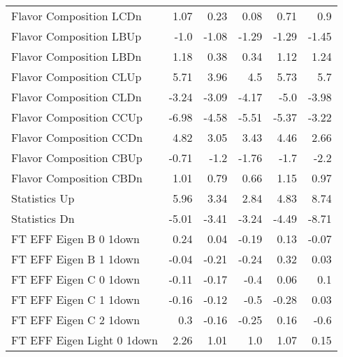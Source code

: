 \begin{table}[htbp]
{\begin{tabular}{lrrrrr}
Flavor Composition LCDn                                                  & 1.07              & 0.23   & 0.08  & 0.71  & 0.9    \\
Flavor Composition LBUp                                                  & -1.0              & -1.08  & -1.29 & -1.29 & -1.45  \\
Flavor Composition LBDn                                                  & 1.18              & 0.38   & 0.34  & 1.12  & 1.24   \\
Flavor Composition CLUp                                                  & 5.71              & 3.96   & 4.5   & 5.73  & 5.7    \\
Flavor Composition CLDn                                                  & -3.24             & -3.09  & -4.17 & -5.0  & -3.98  \\
Flavor Composition CCUp                                                  & -6.98             & -4.58  & -5.51 & -5.37 & -3.22  \\
Flavor Composition CCDn                                                  & 4.82              & 3.05   & 3.43  & 4.46  & 2.66   \\
Flavor Composition CBUp                                                  & -0.71             & -1.2   & -1.76 & -1.7  & -2.2   \\
Flavor Composition CBDn                                                  & 1.01              & 0.79   & 0.66  & 1.15  & 0.97   \\
Statistics Up                                                & 5.96              & 3.34   & 2.84  & 4.83  & 8.74   \\
Statistics Dn                                                & -5.01             & -3.41  & -3.24 & -4.49 & -8.71  \\
FT EFF Eigen B 0  1down                         & 0.24              & 0.04   & -0.19 & 0.13  & -0.07  \\
FT EFF Eigen B 1  1down                         & -0.04             & -0.21  & -0.24 & 0.32  & 0.03   \\
FT EFF Eigen C 0  1down                         & -0.11             & -0.17  & -0.4  & 0.06  & 0.1    \\
FT EFF Eigen C 1  1down                         & -0.16             & -0.12  & -0.5  & -0.28 & 0.03   \\
FT EFF Eigen C 2  1down                         & 0.3               & -0.16  & -0.25 & 0.16  & -0.6   \\
FT EFF Eigen Light 0  1down                     & 2.26              & 1.01   & 1.0   & 1.07  & 0.15   \\

\end{tabular}}
\end{table}
